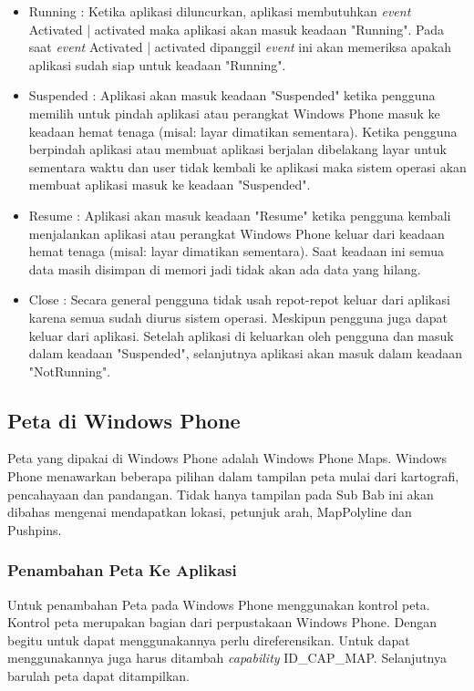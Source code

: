 \begin{itemize}
	\item Running : Ketika aplikasi diluncurkan, aplikasi membutuhkan \textit{event} Activated | activated maka aplikasi akan masuk keadaan "Running". Pada saat \textit{event} Activated | activated dipanggil \textit{event} ini akan memeriksa apakah aplikasi sudah siap untuk keadaan "Running".
	\item Suspended : Aplikasi akan masuk keadaan "Suspended" ketika pengguna memilih untuk pindah aplikasi atau perangkat Windows Phone masuk ke keadaan hemat tenaga (misal: layar dimatikan sementara). Ketika pengguna berpindah aplikasi atau membuat aplikasi berjalan dibelakang layar untuk sementara waktu dan user tidak kembali ke aplikasi maka sistem operasi akan membuat aplikasi masuk ke keadaan "Suspended".
	\item Resume : Aplikasi akan masuk keadaan "Resume" ketika pengguna kembali menjalankan aplikasi atau perangkat Windows Phone keluar dari keadaan hemat tenaga (misal: layar dimatikan sementara). Saat keadaan ini semua data masih disimpan di memori jadi tidak akan ada data yang hilang.
	\item Close : Secara general pengguna tidak usah repot-repot keluar dari aplikasi karena semua sudah diurus sistem operasi. Meskipun pengguna juga dapat keluar dari aplikasi. Setelah aplikasi di keluarkan oleh pengguna dan masuk dalam keadaan "Suspended", selanjutnya aplikasi akan masuk dalam keadaan "NotRunning".
\end{itemize}

\subsection{Peta di Windows Phone}
\label{subsec:Peta di Windows Phone}
\hspace{0.5cm} Peta yang dipakai di Windows Phone adalah Windows Phone Maps. Windows Phone menawarkan beberapa pilihan dalam tampilan peta mulai dari kartografi, pencahayaan dan pandangan. Tidak hanya tampilan pada Sub Bab ini akan dibahas mengenai mendapatkan lokasi, petunjuk arah, MapPolyline dan Pushpins.

\subsubsection{Penambahan Peta Ke Aplikasi}
\label{subsubsec:Penambahan Peta Ke Aplikasi}
\hspace{0.5cm} Untuk penambahan Peta pada Windows Phone menggunakan kontrol peta. Kontrol peta merupakan bagian dari perpustakaan Windows Phone. Dengan begitu untuk dapat menggunakannya perlu direferensikan. Untuk dapat menggunakannya juga harus ditambah \textit{capability} ID\_CAP\_MAP. Selanjutnya barulah peta dapat ditampilkan.


